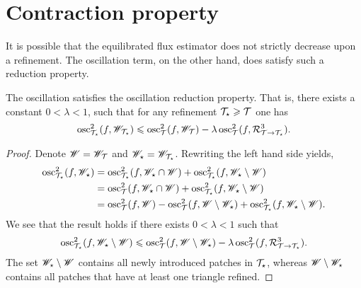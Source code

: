 \documentclass[thesis.tex]{subfiles}
\begin{document}
\section{Contraction property}
It is possible that the equilibrated flux estimator does not strictly decrease upon a refinement.
The oscillation term, on the other hand, does satisfy such a reduction property.
\begin{lem}
  \label{lem:oscasum}
  The oscillation satisfies the oscillation reduction property. That is, there exists a constant $0 < \lambda < 1$, such that for any refinement $\mathcal{T}_\star \geqslant \mathcal{T}$ one has
  \[
    \operatorname{osc}_{\mathcal{T}_\star}^2(f, \mathscr{W}_{\mathcal{T}_\star}) \leqslant \operatorname{osc}^2_{\mathcal{T}}(f, \mathscr{W}_{\mathcal{T}}) - \lambda \operatorname{osc}^2_{\mathcal{T}}(f, \mathcal{R}^3_{\mathcal{T} \to \mathcal{T}_\star}).
  \]
\end{lem}
\begin{proof}
  Denote $\mathscr{W} = \mathscr{W}_{\mathcal{T}}$ and $\mathscr{W}_\star = \mathscr{W}_{\mathcal{T}_\star}$. Rewriting the left hand side yields,
  \begin{align*}
    \operatorname{osc}_{\mathcal{T}_\star}^2(f, \mathscr{W}_\star) &= \operatorname{osc}^2_{\mathcal{T}_\star}(f, \mathscr{W}_\star \cap \mathscr{W}) + \operatorname{osc}^2_{\mathcal{T}_\star}(f, \mathscr{W}_\star \setminus \mathscr{W})\\
    &= \operatorname{osc}^2_{\mathcal{T}}(f, \mathscr{W}_\star \cap \mathscr{W}) + \operatorname{osc}^2_{\mathcal{T}_\star}(f, \mathscr{W}_\star \setminus \mathscr{W})\\
    &= \operatorname{osc}^2_{\mathcal{T}}(f, \mathscr{W}) - \operatorname{osc}^2_{\mathcal{T}}(f, \mathscr{W} \setminus \mathscr{W}_\star) + \operatorname{osc}_{\mathcal{T}_\star}^2(f, \mathscr{W}_\star \setminus \mathscr{W}).
  \end{align*}
  We see that the result holds if there exists $0 < \lambda < 1$ such that
  \begin{equation}
    \label{eq:blabla}
    \operatorname{osc}_{\mathcal{T}_\star}^2(f, \mathscr{W}_\star \setminus \mathscr{W}) \leqslant \operatorname{osc}_{\mathcal{T}}^2(f, \mathscr{W}\setminus \mathscr{W}_\star) - \lambda \operatorname{osc}_{\mathcal{T}}^2(f, \mathcal{R}^3_{\mathcal{T} \to \mathcal{T}_\star}).
  \end{equation}
  The set $\mathscr{W}_\star \setminus \mathscr{W}$ contains all newly introduced patches in $\mathcal{T}_\star$, whereas $\mathscr{W} \setminus \mathscr{W}_\star$ contains
  all patches that have at least one triangle refined.



\end{proof}
\end{document}
